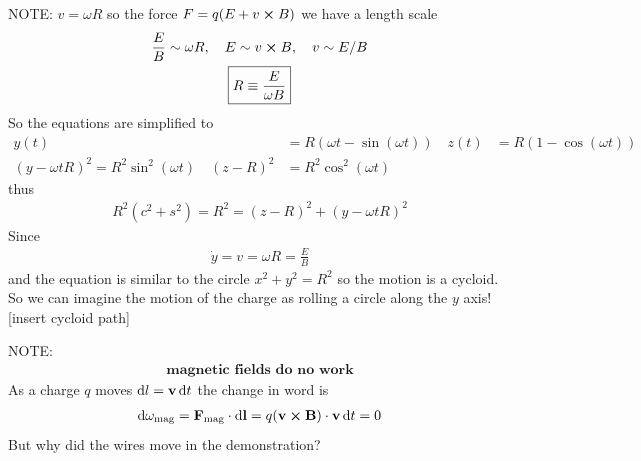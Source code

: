 \documentclass[../main.tex]{subfiles}
\begin{document}
NOTE: $v = \omega R$ so the force $F = q(E + v \cross B)$ we have a length scale
\begin{gather*}
    \frac{E}{B} \sim \omega R, \quad E \sim v \cross B, \quad v \sim E/B \\
    \boxed{R \equiv \frac{E}{\omega B}}
\end{gather*}
So the equations are simplified to
\begin{align*}
    y(t) &= R(\omega t - \sin(\omega t))  \quad z(t) &= R(1 - \cos(\omega t))\\
    (y - \omega t R)^2 = R^2 \sin^2(\omega t) \quad (z - R)^2 &= R^2 \cos^2(\omega t)
\end{align*}
thus
\begin{align*}
    R^2 (c^2 + s^2) = R^2 = (z - R)^2 + (y - \omega t R)^2
\end{align*}
Since
\begin{align*}
    \dot y = v = \omega R = \frac{E}{B} 
\end{align*}
and the equation is similar to the circle $x^2 + y^2 = R^2$ so the motion is a cycloid.
So we can imagine the motion of the charge as rolling a circle along the $y$ axis! [insert cycloid path]

NOTE:
\begin{align*}
    \boxed{\textbf{magnetic fields do no work}}
\end{align*}
As a charge $q$ moves $\dd{l} = \vb v \dd{t}$ the change in word is
\begin{align*}
    \dd{\omega_\text{mag}} = \vb F_\text{mag} \cdot \dd{\vb l} = q(\vb v \cross \vb B) \cdot \vb v \dd{t} = 0
\end{align*}
But why did the wires move in the demonstration?
\end{document}
